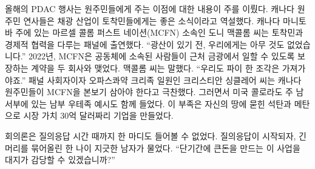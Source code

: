 \documentclass{translation}
\begin{document}
올해의 PDAC 행사는 원주민들에게 주는 이점에 대한 내용이 주를 이뤘다.
캐나다 원주민 연사들은 채광 산업이 토착민들에게는 좋은 소식이라고 역설했다.
캐나다 마니토바 주에 있는 마르셀 콜롬 퍼스트 네이션(MCFN) 소속인 도니 맥콜롬 씨는 토착민과 경제적 협력을 다루는 패널에 출연했다.
``광산이 있기 전, 우리에게는 아무 것도 없었습니다.''
2022년, MCFN은 공동체에 소속된 사람들이 근처 금광에서 일할 수 있도록 보장하는 계약을 두 회사와 맺었다.
맥콜롬 씨는 말했다.
``우리도 파이 한 조각은 가져가야죠.''
패널 사회자이자 오파스콰약 크리족 일원인 크리스티안 싱클레어 씨는 캐나다 원주민들이 MCFN을 본보기 삼아야 한다고 극찬했다.
그러면서 미국 콜로라도 주 남서부에 있는 남부 우테족 예시도 함께 들었다.
이 부족은 자신의 땅에 묻힌 석탄과 메탄으로 시장 가치 30억 달러짜리 기업을 만들었다.
% 

회의론은 질의응답 시간 때까지 한 마디도 들어볼 수 없었다.
질의응답이 시작되자, 긴 머리를 묶어올린 한 나이 지긋한 남자가 물었다.
``단기간에 큰돈을 만드는 이 사업을 대지가 감당할 수 있겠습니까?''
% 
\end{document}
